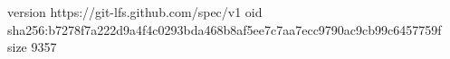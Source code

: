 version https://git-lfs.github.com/spec/v1
oid sha256:b7278f7a222d9a4f4c0293bda468b8af5ee7c7aa7ecc9790ac9cb99c6457759f
size 9357
